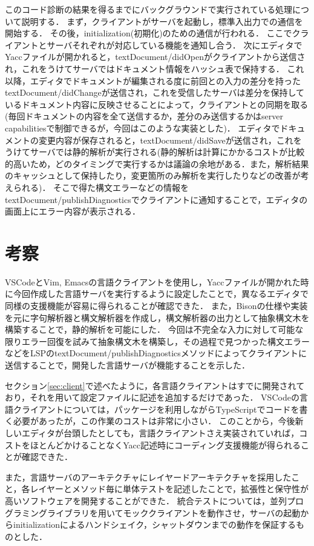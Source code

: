 \documentclass[fontsize=9bp,twocolumn,column_gap=2.36zw,a4paper,report]{jlreq}
\begin{document}
このコード診断の結果を得るまでにバックグラウンドで実行されている処理について説明する．
まず，クライアントがサーバを起動し，標準入出力での通信を開始する．
その後，initialization(初期化)のための通信が行われる．
ここでクライアントとサーバそれぞれが対応している機能を通知し合う．
次にエディタでYaccファイルが開かれると，textDocument/didOpenがクライアントから送信され，これをうけてサーバではドキュメント情報をハッシュ表で保持する．
これ以降，エディタでドキュメントが編集される度に前回との入力の差分を持ったtextDocument/didChangeが送信され，これを受信したサーバは差分を保持しているドキュメント内容に反映させることによって，クライアントとの同期を取る(毎回ドキュメントの内容を全て送信するか，差分のみ送信するかはserver capabilitiesで制御できるが，今回はこのような実装とした)．
エディタでドキュメントの変更内容が保存されると，textDocument/didSaveが送信され，これをうけてサーバでは静的解析が実行される(静的解析は計算にかかるコストが比較的高いため，どのタイミングで実行するかは議論の余地がある．また，解析結果のキャッシュとして保持したり，変更箇所のみ解析を実行したりなどの改善が考えられる)．
そこで得た構文エラーなどの情報をtextDocument/publishDiagnosticsでクライアントに通知することで，エディタの画面上にエラー内容が表示される．
\newline

\chapter{考察}

VSCodeとVim, Emacsの言語クライアントを使用し，Yaccファイルが開かれた時に今回作成した言語サーバを実行するように設定したことで，異なるエディタで同様の支援機能が容易に得られることが確認できた．
また，Bisonの仕様や実装を元に字句解析器と構文解析器を作成し，構文解析器の出力として抽象構文木を構築することで，静的解析を可能にした．
今回は不完全な入力に対して可能な限りエラー回復を試みて抽象構文木を構築し，その過程で見つかった構文エラーなどをLSPのtextDocument/publishDiagnosticsメソッドによってクライアントに送信することで，開発した言語サーバが機能することを示した．\par
セクション\ref{sec:client}で述べたように，各言語クライアントはすでに開発されており，それを用いて設定ファイルに記述を追加するだけであった．
VSCodeの言語クライアントについては，パッケージを利用しながらTypeScriptでコードを書く必要があったが，この作業のコストは非常に小さい．
このことから，今後新しいエディタが台頭したとしても，言語クライアントさえ実装されていれば，コストをほとんどかけることなくYacc記述時にコーディング支援機能が得られることが確認できた．\par
また，言語サーバのアーキテクチャにレイヤードアーキテクチャを採用したこと，各レイヤーとメソッド毎に単体テストを記述したことで，拡張性と保守性が高いソフトウェアを開発することができた．
統合テストについては，並列プログラミングライブラリを用いてモッククライアントを動作させ，サーバの起動からinitializationによるハンドシェイク，シャットダウンまでの動作を保証するものとした．
\newline
\end{document}
